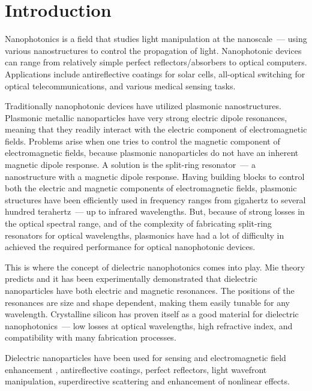 \section*{Introduction}
\label{ch:Intro}
        Nanophotonics is a field that studies light manipulation at the nanoscale~--- using various nanostructures to control the
    propagation of light. Nanophotonic devices can range from relatively simple perfect reflectors/absorbers to optical computers.
    Applications include antireflective coatings for solar cells, all-optical switching for optical telecommunications, and various
    medical sensing tasks.

        Traditionally nanophotonic devices have utilized plasmonic nanostructures. Plasmonic metallic nanoparticles have very strong
    electric dipole resonances, meaning that they readily interact with the electric component of electromagnetic fields. Problems arise
    when one tries to control the magnetic component of electromagnetic fields, because plasmonic nanoparticles do not have an inherent
    magnetic dipole response. A solution is the split-ring resonator~--- a nanostructure with a magnetic dipole response. Having building
    blocks to control both the electric and magnetic components of electromagnetic fields, plasmonic structures have been efficiently
    used in frequency ranges from gigahertz to several hundred terahertz~--- up to infrared wavelengths. But, because of strong losses
    in the optical spectral range, and of the complexity of fabricating split-ring resonators for optical wavelengths, plasmonics have
    had a lot of difficulty in achieved the required performance for optical nanophotonic devices.\cite{krasnok2015towards}

        This is where the concept of dielectric nanophotonics comes into play. Mie theory predicts\cite{mie1908beitrage} and
    it has been experimentally demonstrated\cite{kuznetsov2012magnetic} that dielectric nanoparticles have both electric and
    magnetic resonances. The positions of the resonances are size and shape dependent, making them easily tunable for any wavelength.
    Crystalline silicon has proven itself as a good material for dielectric nanophotonics~--- low losses at optical wavelengths\cite{palik1998handbook},
    high refractive index, and compatibility with many fabrication processes\cite{popa2008compact,zhao2009mie,evlyukhin2010optical,garcia2011strong,
    krasnok2012all,ginn2012realizing,fu2012directional,krasnok2015towards}.

        Dielectric nanoparticles have been used for sensing and electromagnetic field enhancement \cite{albella2013low,zambrana2015purcell,
    bakker2015magnetic,caldarola2015non}, antireflective coatings\cite{spinelli2012broadband},  perfect reflectors\cite{evlyukhin2010optical,
    moitra2014experimental}, light wavefront manipulation\cite{decker2015high,yu2015high}, superdirective scattering\cite{krasnok2014superdirective,
    krasnok2014experimental} and enhancement of nonlinear effects\cite{shcherbakov2014enhanced,makarov2015tuning}.

\clearpage
